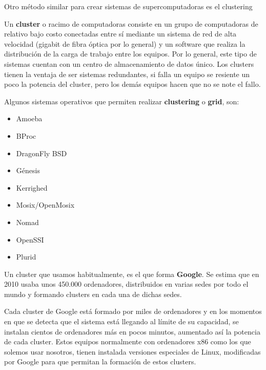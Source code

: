 \documentclass[11pt]{article}
\begin{document}
Otro método similar para crear sistemas de supercomputadoras es el
clustering

Un \textbf{cluster} o racimo de computadoras consiste en un grupo de
computadoras de relativo bajo costo conectadas entre sí mediante un
sistema de red de alta velocidad (gigabit de fibra óptica por lo
general) y un software que realiza la distribución de la carga de
trabajo entre los equipos. Por lo general, este tipo de sistemas cuentan
con un centro de almacenamiento de datos único. Los clusters tienen la
ventaja de ser sistemas redundantes, si falla un equipo se resiente un
poco la potencia del cluster, pero los demás equipos hacen que no se
note el fallo.

Algunos sistemas operativos que permiten realizar \textbf{clustering} o \textbf{grid},
son:

\begin{itemize}
\item Amoeba
\item BProc
\item DragonFly BSD
\item Génesis
\item Kerrighed
\item Mosix/OpenMosix
\item Nomad
\item OpenSSI
\item Plurid
\end{itemize}

Un cluster que usamos habitualmente, es el que forma \textbf{Google}. Se estima
que en 2010 usaba unos 450.000 ordenadores, distribuidos en varias sedes
por todo el mundo y formando clusters en cada una de dichas sedes.

Cada cluster de Google está formado por miles de ordenadores y en los
momentos en que se detecta que el sistema está llegando al límite de su
capacidad, se instalan cientos de ordenadores más en pocos minutos,
aumentado así la potencia de cada cluster. Estos equipos normalmente con
ordenadores x86 como los que solemos usar nosotros, tienen instalada
versiones especiales de Linux, modificadas por Google para que permitan
la formación de estos clusters.
\end{document}
